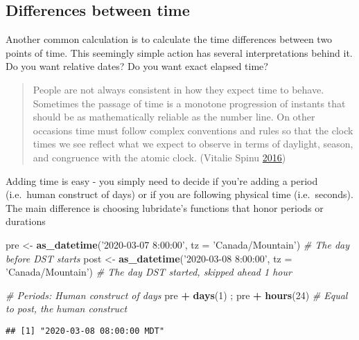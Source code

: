 \documentclass[
]{book}
\newenvironment{Shaded}{\begin{snugshade}}{\end{snugshade}}
\newcommand{\CommentTok}[1]{\textcolor[rgb]{0.56,0.35,0.01}{\textit{#1}}}
\newcommand{\DataTypeTok}[1]{\textcolor[rgb]{0.13,0.29,0.53}{#1}}
\newcommand{\DecValTok}[1]{\textcolor[rgb]{0.00,0.00,0.81}{#1}}
\newcommand{\KeywordTok}[1]{\textcolor[rgb]{0.13,0.29,0.53}{\textbf{#1}}}
\newcommand{\NormalTok}[1]{#1}
\newcommand{\OperatorTok}[1]{\textcolor[rgb]{0.81,0.36,0.00}{\textbf{#1}}}
\newcommand{\StringTok}[1]{\textcolor[rgb]{0.31,0.60,0.02}{#1}}
\begin{document}
\hypertarget{differences-between-time}{%
\subsection{Differences between time}\label{differences-between-time}}

Another common calculation is to calculate the time differences between two points of time. This seemingly simple action has several interpretations behind it. Do you want relative dates? Do you want exact elapsed time?

\begin{quote}
People are not always consistent in how they expect time to behave. Sometimes the passage of time is a monotone progression of instants that should be as mathematically reliable as the number line. On other occasions time must follow complex conventions and rules so that the clock times we see reflect what we expect to observe in terms of daylight, season, and congruence with the atomic clock. (Vitalie Spinu \protect\hyperlink{ref-lubridate-help}{2016})
\end{quote}

Adding time is easy - you simply need to decide if you're adding a period (i.e.~human construct of days) or if you are following physical time (i.e.~seconds). The main difference is choosing lubridate's functions that honor periods or durations

\begin{Shaded}
\begin{Highlighting}[]
\NormalTok{pre <-}\StringTok{ }\KeywordTok{as_datetime}\NormalTok{(}\StringTok{'2020-03-07 8:00:00'}\NormalTok{, }\DataTypeTok{tz =} \StringTok{'Canada/Mountain'}\NormalTok{) }\CommentTok{# The day before DST starts}
\NormalTok{post <-}\StringTok{ }\KeywordTok{as_datetime}\NormalTok{(}\StringTok{'2020-03-08 8:00:00'}\NormalTok{, }\DataTypeTok{tz =} \StringTok{'Canada/Mountain'}\NormalTok{) }\CommentTok{# The day DST started, skipped ahead 1 hour}

\CommentTok{# Periods: Human construct of days}
\NormalTok{pre }\OperatorTok{+}\StringTok{ }\KeywordTok{days}\NormalTok{(}\DecValTok{1}\NormalTok{) ; pre }\OperatorTok{+}\StringTok{ }\KeywordTok{hours}\NormalTok{(}\DecValTok{24}\NormalTok{) }\CommentTok{# Equal to post, the human construct}
\end{Highlighting}
\end{Shaded}

\begin{verbatim}
## [1] "2020-03-08 08:00:00 MDT"
\end{verbatim}
\end{document}
